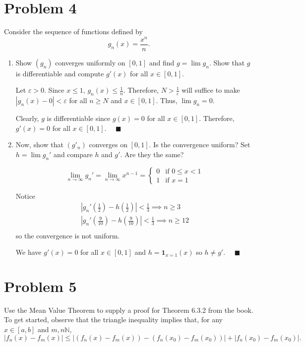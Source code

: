 \documentclass[12pt]{article}
\newcommand{\qed}{\quad \blacksquare}
\newcommand{\abs}[1]{\left\vert #1 \right\vert}
\newcommand{\ep}{\varepsilon}
\begin{document}
\section*{Problem 4 }
Consider the sequence of functions defined by 
\begin{equation*}
	g_n(x)=\frac{x^n}{n}.
\end{equation*}
\begin{enumerate}
	\item Show $(g_n)$ converges uniformly on $[0,1]$ and find $g=\lim g_n$. Show that $g$ is differentiable and compute $g'(x)$ for all $x\in[0,1]$.
	
        \color{blue}
            Let $\ep > 0$. Since $x \leq 1$, $g_n(x) \leq \frac{1}{n}$. Therefore, $N > \frac{1}{\ep}$ will suffice to make $\abs{g_n(x) - 0} < \ep$ for all $n \geq N$ and $x \in [0, 1]$. Thus, $\lim g_n = 0$. 

            Clearly, $g$ is differentiable since $g(x) = 0$ for all $x \in [0, 1]$. Therefore, $g'(x) = 0$ for all $x \in [0, 1]$. $\qed$
        \color{black}

	\item Now, show that $(g'_n)$ converges on $[0,1]$. Is the convergence uniform? Set $h=\lim g_n'$ and compare $h$ and $g'$. Are they the same?

        \color{blue}
            \[\lim_{n \to \infty} g_n' = \lim_{n \to \infty} x^{n-1} = \begin{cases}
                0 & \text{if } 0 \leq x < 1\\
                1 & \text{if } x = 1
            \end{cases}\] 
            
            Notice 
            \begin{align*}
                \abs{g_n'(\frac{1}{2}) - h(\frac{1}{2})} < \frac{1}{3} \implies n \geq 3\\ 
                \abs{g_n'(\frac{9}{10}) - h(\frac{9}{10})} < \frac{1}{3} \implies n \geq 12\\
            \end{align*}
            so the convergence is not uniform.

            We have $g'(x) = 0$ for all $x \in [0, 1]$ and $h = \mathbf{1}_{x=1}(x)$ so $h \neq g'$. $\qed$
            
        \color{black}

\end{enumerate}


\pagebreak
\section*{Problem 5}
Use the Mean Value Theorem to supply a proof for Theorem 6.3.2 from the book. To get started, observe that the triangle inequality implies that, for any $x\in[a,b]$ and $m,n\mathbb{N}$,
\begin{equation*}
	|f_n(x)-f_m(x)|\leq|(f_n(x)-f_m(x))-(f_n(x_0)-f_m(x_0))|+|f_n(x_0)-f_m(x_0)|.
\end{equation*}
\end{document}
